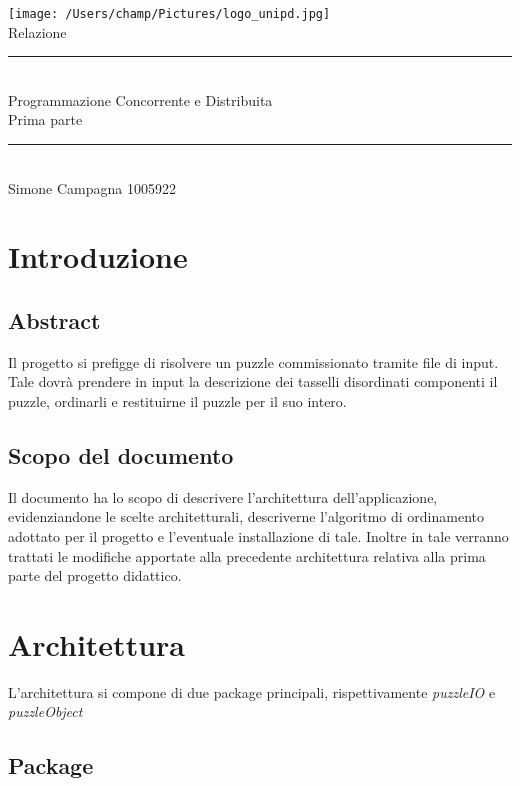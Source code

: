 \documentclass[11pt]{article}
\begin{document}
	\begingroup
    \centering
    \texttt{[image: /Users/champ/Pictures/logo\_unipd.jpg]}\\
    \vspace{3cm}
    {\Huge Relazione}\\
    \rule{12cm}{0.4pt}\\
    \vspace{1cm}
    {\Large Programmazione Concorrente e Distribuita}\\
    \vspace{0.3cm} 
    {Prima parte}
    \rule{12cm}{0.4pt}\\
    \vspace{1cm}
    {\Large Simone Campagna 1005922}\\

    \endgroup
    \setcounter{page}{0}
    \thispagestyle{empty}
    \clearpage
    \setcounter{page}{1}
   


\section{Introduzione}
\subsection{Abstract}
Il progetto si prefigge di risolvere un puzzle commissionato tramite file di input. Tale dovrà prendere in input la descrizione dei tasselli disordinati componenti il puzzle, ordinarli e restituirne il puzzle per il suo intero.
\subsection{Scopo del documento}
Il documento ha lo scopo di descrivere l'architettura dell'applicazione, evidenziandone le scelte architetturali, descriverne l'algoritmo di ordinamento adottato per il progetto e l'eventuale installazione di tale. Inoltre in tale verranno trattati le modifiche apportate alla precedente architettura relativa alla prima parte del progetto didattico.
\section{Architettura}
L'architettura si compone di due package principali, rispettivamente \textit{puzzleIO} e \textit{puzzleObject}
\subsection{Package}
\end{document}
